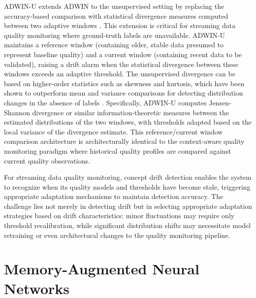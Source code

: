 ADWIN-U extends ADWIN to the unsupervised setting by replacing the accuracy-based comparison with statistical divergence measures computed between two adaptive windows \citep{adwin2025}. This extension is critical for streaming data quality monitoring where ground-truth labels are unavailable. ADWIN-U maintains a reference window (containing older, stable data presumed to represent baseline quality) and a current window (containing recent data to be validated), raising a drift alarm when the statistical divergence between these windows exceeds an adaptive threshold. The unsupervised divergence can be based on higher-order statistics such as skewness and kurtosis, which have been shown to outperform mean and variance comparisons for detecting distribution changes in the absence of labels \citep{adwin2025}. Specifically, ADWIN-U computes Jensen-Shannon divergence or similar information-theoretic measures between the estimated distributions of the two windows, with thresholds adapted based on the local variance of the divergence estimate. This reference/current window comparison architecture is architecturally identical to the context-aware quality monitoring paradigm where historical quality profiles are compared against current quality observations.

For streaming data quality monitoring, concept drift detection enables the system to recognize when its quality models and thresholds have become stale, triggering appropriate adaptation mechanisms to maintain detection accuracy. The challenge lies not merely in detecting drift but in selecting appropriate adaptation strategies based on drift characteristics: minor fluctuations may require only threshold recalibration, while significant distribution shifts may necessitate model retraining or even architectural changes to the quality monitoring pipeline.

\section{Memory-Augmented Neural Networks}

